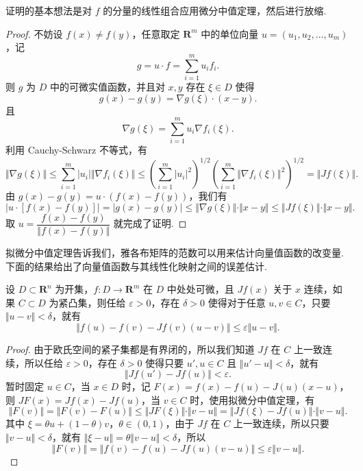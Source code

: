 证明的基本想法是对 $f$ 的分量的线性组合应用微分中值定理，然后进行放缩.

\begin{proof}
    不妨设 $f(x) \neq f(y)$，任意取定 $\mathbf{R}^m$ 中的单位向量 $u = (u_1, u_2, \ldots, u_m)$，记\[g = u\cdot f = \sum_{i = 1}^{m}u_if_i.\]
    则 $g$ 为 $D$ 中的可微实值函数，并且对 $x, y$ 存在 $\xi\in D$ 使得 \[g(x) - g(y) = \nabla g(\xi)\cdot (x - y).\]
    且 \[\nabla g(\xi) = \sum_{i = 1}^{m}u_i\nabla f_i(\xi).\]
    利用 Cauchy-Schwarz 不等式，有 \[\Vert \nabla g(\xi)\Vert \leqslant \sum_{i = 1}^m\vert u_i\vert \Vert \nabla f_i(\xi)\Vert \leqslant \left(\sum_{i = 1}^m\vert u_i\vert^2\right)^{1/2}\left(\sum_{i = 1}^m\Vert \nabla f_i(\xi)\Vert^2\right)^{1/2} = \Vert Jf(\xi)\Vert.\]
    由 $g(x) - g(y) = u\cdot (f(x) - f(y))$，我们有 \[\vert u \cdot [f(x) - f(y)]\vert = \vert g(x) - g(y) \vert \leqslant \Vert \nabla g(\xi)\Vert \cdot \Vert x - y\Vert \leqslant \Vert Jf(\xi)\Vert\cdot \Vert x - y\Vert.\]
    取 $u = \dfrac{f(x) - f(y)}{\Vert f(x) - f(y)\Vert}$ 就完成了证明.
\end{proof}

拟微分中值定理告诉我们，雅各布矩阵的范数可以用来估计向量值函数的改变量. 下面的结果给出了向量值函数与其线性化映射之间的误差估计.

\begin{corollary}{}{}
    设 $D\subset \mathbf{R}^n$ 为开集，$f\colon D\to \mathbf{R}^m$ 在 $D$ 中处处可微，且 $Jf(x)$ 关于 $x$ 连续，如果 $C\subset D$ 为紧凸集，则任给 $\varepsilon>0$，存在 $\delta>0$ 使得对于任意 $u, v\in C$，只要 $\Vert u-v\Vert < \delta$，就有\[\Vert f(u) - f(v) - Jf(v)(u-v)\Vert \leqslant \varepsilon\Vert u-v\Vert.\]
\end{corollary}

\begin{proof}
    由于欧氏空间的紧子集都是有界闭的，所以我们知道 $Jf$ 在 $C$ 上一致连续，所以任给 $\varepsilon>0$，存在 $\delta>0$ 使得只要 $u',u\in C$ 且 $\Vert u'-u\Vert < \delta$，就有\[\Vert Jf(u') - Jf(u)\Vert < \varepsilon.\]
    暂时固定 $u\in C$，当 $x\in D$ 时，记 $F(x) = f(x) - f(u) - J(u)(x - u)$，则 $JF(x) = Jf(x) - Jf(u)$，当 $v\in C$ 时，使用拟微分中值定理，有
    \[\Vert F(v)\Vert = \Vert F(v) - F(u)\Vert \leqslant \Vert JF(\xi)\Vert\cdot \Vert v - u\Vert = \Vert Jf(\xi) - Jf(u)\Vert\cdot \Vert v - u\Vert.\]
    其中 $\xi = \theta u + (1-\theta)v$，$\theta\in (0, 1)$，由于 $Jf$ 在 $C$ 上一致连续，所以只要 $\Vert v - u\Vert < \delta$，就有 $\Vert \xi - u\Vert = \theta \Vert v - u\Vert < \delta$，所以\[\Vert F(v)\Vert = \Vert f(v) - f(u) - Jf(u)(v - u)\Vert \leqslant \varepsilon\Vert v - u\Vert.\]
\end{proof}

